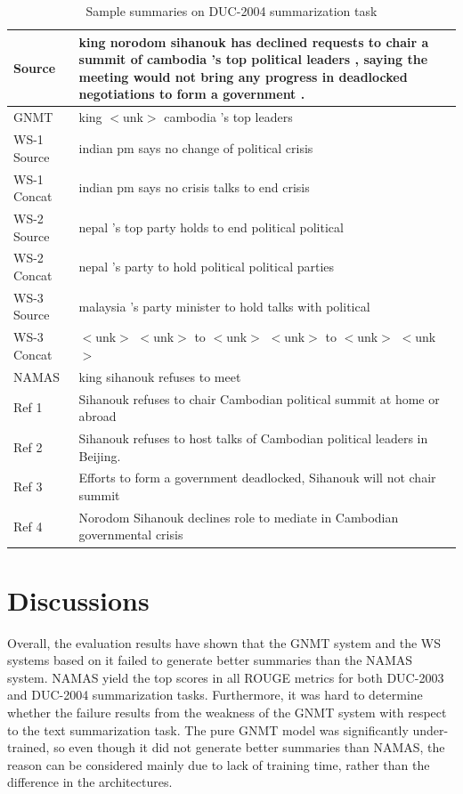 \documentclass[letterpaper]{article} %
\begin{document}
\begin{table}[h]
	\begin{tabular}{p{40pt} p{170pt}}
		Source & king norodom sihanouk has declined requests to chair a summit of cambodia 's top political leaders , saying the meeting would not bring any progress in deadlocked negotiations to form a government . \\
		\hline
		GNMT & king $<$unk$>$ cambodia 's top leaders \\
		WS-1 Source & indian pm says no change of political crisis \\
		WS-1 Concat & indian pm says no crisis talks to end crisis \\
		WS-2 Source & nepal 's top party holds to end political political \\
		WS-2 Concat & nepal 's party to hold political political parties \\
		WS-3 Source & malaysia 's party minister to hold talks with political \\
		WS-3 Concat & $<$unk$>$ $<$unk$>$ to $<$unk$>$ $<$unk$>$ to $<$unk$>$ $<$unk$>$ \\
		NAMAS & king sihanouk refuses to meet \\
		\hline
		Ref 1 & Sihanouk refuses to chair Cambodian political summit at home or abroad\\
		Ref 2 & Sihanouk refuses to host talks of Cambodian political leaders in Beijing.\\
		Ref 3 & Efforts to form a government deadlocked, Sihanouk will not chair summit\\
		Ref 4 & Norodom Sihanouk declines role to mediate in Cambodian governmental crisis
	\end{tabular}
	\caption{Sample summaries on DUC-2004 summarization task}
	\label{table:sampleduc2004}
\end{table}

\section{Discussions}
Overall, the evaluation results have shown that the GNMT system and the WS systems based on it failed to generate better summaries than the NAMAS system. NAMAS yield the top scores in all ROUGE metrics for both DUC-2003 and DUC-2004 summarization tasks. Furthermore, it was hard to determine whether the failure results from the weakness of the GNMT system with respect to the text summarization task. The pure GNMT model was significantly under-trained, so even though it did not generate better summaries than NAMAS, the reason can be considered mainly due to lack of training time, rather than the difference in the architectures.
\end{document}
